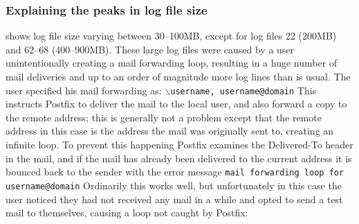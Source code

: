 
\subsubsection{Explaining the peaks in log file size}

\label{Explaining the peaks in log file size}

 shows log
file size varying between 30--100MB, except for log files 22 (200MB) and
62--68 (400--900MB).  These large log files were caused by a user
unintentionally creating a mail forwarding loop, resulting in a huge number
of mail deliveries and up to an order of magnitude more log lines than is
usual.  The user specified his mail forwarding as: \newline
\tab{}\texttt{$\backslash$username, username@domain} \newline This
instructs Postfix to deliver the mail to the local user, and also forward a
copy to the remote address; this is generally not a problem except that the
remote address in this case is the address the mail was originally sent to,
creating an infinite loop.  To prevent this happening Postfix examines the
Delivered-To header in the mail, and if the mail has already been delivered
to the current address it is bounced back to the sender with the error
message \newline{} \tab{} \texttt{mail forwarding loop for
username@domain}\newline{}  Ordinarily this
works well, but unfortunately in this case the user noticed they had not
received any mail in a while and opted to send a test mail to themselves,
causing a loop not caught by Postfix:

